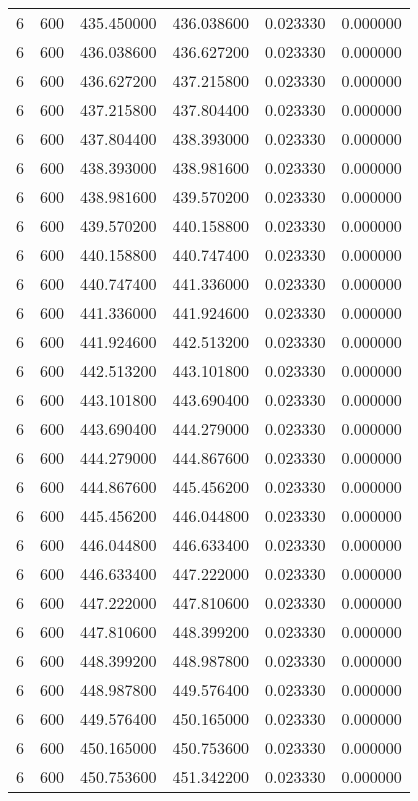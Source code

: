 \begin{longtable}{rrrrrr}
6 & 600 & 435.450000 & 436.038600 & 0.023330 & 0.000000 \\
6 & 600 & 436.038600 & 436.627200 & 0.023330 & 0.000000 \\
6 & 600 & 436.627200 & 437.215800 & 0.023330 & 0.000000 \\
6 & 600 & 437.215800 & 437.804400 & 0.023330 & 0.000000 \\
6 & 600 & 437.804400 & 438.393000 & 0.023330 & 0.000000 \\
6 & 600 & 438.393000 & 438.981600 & 0.023330 & 0.000000 \\
6 & 600 & 438.981600 & 439.570200 & 0.023330 & 0.000000 \\
6 & 600 & 439.570200 & 440.158800 & 0.023330 & 0.000000 \\
6 & 600 & 440.158800 & 440.747400 & 0.023330 & 0.000000 \\
6 & 600 & 440.747400 & 441.336000 & 0.023330 & 0.000000 \\
6 & 600 & 441.336000 & 441.924600 & 0.023330 & 0.000000 \\
6 & 600 & 441.924600 & 442.513200 & 0.023330 & 0.000000 \\
6 & 600 & 442.513200 & 443.101800 & 0.023330 & 0.000000 \\
6 & 600 & 443.101800 & 443.690400 & 0.023330 & 0.000000 \\
6 & 600 & 443.690400 & 444.279000 & 0.023330 & 0.000000 \\
6 & 600 & 444.279000 & 444.867600 & 0.023330 & 0.000000 \\
6 & 600 & 444.867600 & 445.456200 & 0.023330 & 0.000000 \\
6 & 600 & 445.456200 & 446.044800 & 0.023330 & 0.000000 \\
6 & 600 & 446.044800 & 446.633400 & 0.023330 & 0.000000 \\
6 & 600 & 446.633400 & 447.222000 & 0.023330 & 0.000000 \\
6 & 600 & 447.222000 & 447.810600 & 0.023330 & 0.000000 \\
6 & 600 & 447.810600 & 448.399200 & 0.023330 & 0.000000 \\
6 & 600 & 448.399200 & 448.987800 & 0.023330 & 0.000000 \\
6 & 600 & 448.987800 & 449.576400 & 0.023330 & 0.000000 \\
6 & 600 & 449.576400 & 450.165000 & 0.023330 & 0.000000 \\
6 & 600 & 450.165000 & 450.753600 & 0.023330 & 0.000000 \\
6 & 600 & 450.753600 & 451.342200 & 0.023330 & 0.000000 \\

\end{longtable}
